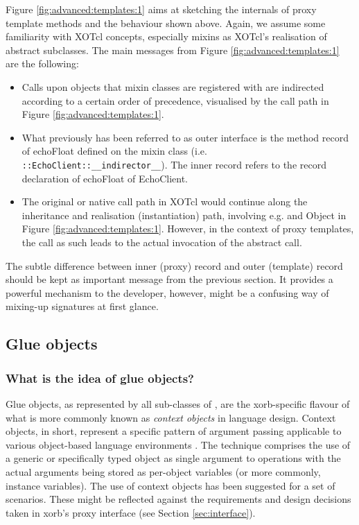 Figure \ref{fig:advanced:templates:1} aims at sketching the internals of proxy template methods and the 
behaviour shown above. Again, we assume some familiarity with XOTcl concepts, especially mixins as 
XOTcl's realisation of abstract subclasses. The main messages from Figure \ref{fig:advanced:templates:1} are the following:
\begin{itemize}
\item Calls upon objects that mixin classes are registered with are indirected according to a certain order 
of precedence, visualised by the call path in Figure  \ref{fig:advanced:templates:1}.
\item What previously has been referred to as outer interface is the method record of echoFloat defined 
on the mixin class (i.e. \lstinline!::EchoClient::__indirector__!). The inner record refers to the record 
declaration of echoFloat of EchoClient.
\item The original or native call path in XOTcl would continue along the inheritance and realisation 
(instantiation) path, involving e.g.  and Object in Figure  \ref{fig:advanced:templates:1}. 
However, in the context of proxy templates, the call as such leads to the actual invocation of the 
abstract call.
\end{itemize}
\begin{hints}
\item The subtle difference between inner (proxy) record and outer (template) record should be kept as important message from the previous section. It provides a powerful mechanism to the developer, however, might be a confusing way of mixing-up signatures at first glance.
\end{hints}
  \subsection{Glue objects}\label{sec:advanced:xorb:gobjects}
  \subsubsection{What is the idea of glue objects?}\label{sec:advanced:xorb:gobjects:what}
  Glue objects, as represented by all sub-classes of , are the xorb-specific flavour of what is more commonly known as \emph{context objects} in language design. Context objects, in short, represent a specific pattern of argument passing applicable to various object-based language environments \cite{zdun:2005b}. The technique comprises the use of a generic or specifically typed object as single argument to operations with the actual arguments being stored as per-object variables (or more commonly, instance variables). The use of context objects has been suggested for a set of scenarios. These might be reflected against the requirements and design decisions taken in xorb's proxy interface (see Section \ref{sec:interface}).
  
